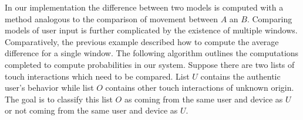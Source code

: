 In our implementation
the difference between two models is computed with a
method analogous to the comparison of movement between $A$ an $B$.
%
Comparing models of user input 
is further complicated by the existence of
multiple windows.
Comparatively, the previous example described how
to compute the average difference for a single window.
%
The following algorithm outlines
the computations completed to compute probabilities in our system.
Suppose there are two lists of touch interactions which need to 
be compared.
List $U$ contains the authentic user's behavior while
list $O$ contains other touch interactions of unknown origin.
The goal is to classify this list $O$ as 
coming from the same user and device as $U$ or
not coming from the same user and device as $U$.
